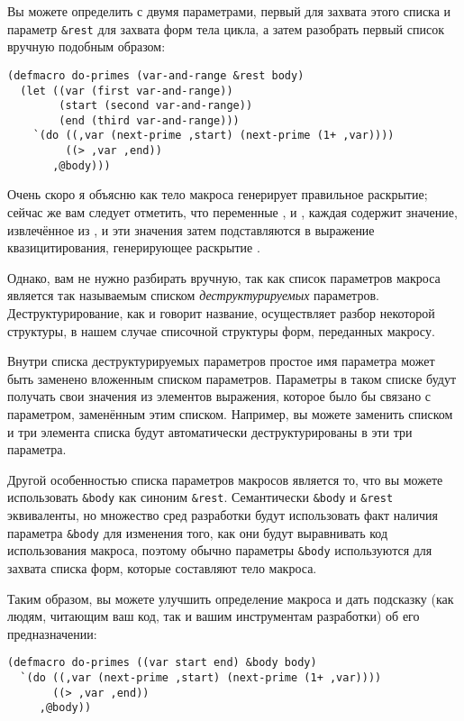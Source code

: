 Вы можете определить  с двумя параметрами, первый для захвата этого списка
и параметр \lstinline!&rest! для захвата форм тела цикла, а затем разобрать первый список
вручную подобным образом:

\begin{lstlisting}
(defmacro do-primes (var-and-range &rest body)
  (let ((var (first var-and-range))
        (start (second var-and-range))
        (end (third var-and-range)))
    `(do ((,var (next-prime ,start) (next-prime (1+ ,var))))
         ((> ,var ,end))
       ,@body)))
\end{lstlisting}

Очень скоро я объясню как тело макроса генерирует правильное раскрытие; сейчас же вам
следует отметить, что переменные ,  и , каждая содержит
значение, извлечённое из , и эти значения затем подставляются в
выражение квазицитирования, генерирующее раскрытие .

Однако, вам не нужно разбирать  вручную, так как список параметров
макроса является так называемым списком \textit{деструктурируемых}
параметров. Деструктурирование, как и говорит название, осуществляет разбор некоторой
структуры, в нашем случае списочной структуры форм, переданных макросу.

Внутри списка деструктурируемых параметров простое имя параметра может быть заменено
вложенным списком параметров. Параметры в таком списке будут получать свои значения из
элементов выражения, которое было бы связано с параметром, заменённым этим
списком. Например, вы можете заменить  списком 
и три элемента списка будут автоматически деструктурированы в эти три параметра.

Другой особенностью списка параметров макросов является то, что вы можете использовать
\lstinline!&body! как синоним \lstinline!&rest!. Семантически \lstinline!&body! и
\lstinline!&rest! эквиваленты, но множество сред разработки будут использовать факт
наличия параметра \lstinline!&body! для изменения того, как они будут выравнивать код
использования макроса, поэтому обычно параметры \lstinline!&body! используются для захвата
списка форм, которые составляют тело макроса.

Таким образом, вы можете улучшить определение макроса  и дать подсказку
(как людям, читающим ваш код, так и вашим инструментам разработки) об его предназначении:

\begin{lstlisting}
(defmacro do-primes ((var start end) &body body)
  `(do ((,var (next-prime ,start) (next-prime (1+ ,var))))
       ((> ,var ,end))
     ,@body))
\end{lstlisting}


